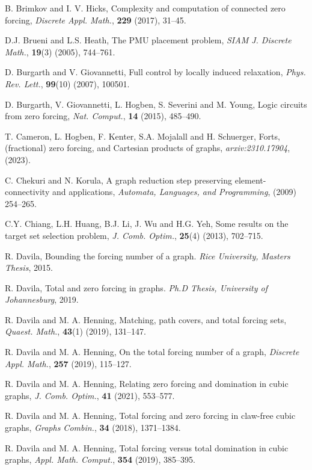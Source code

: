 \documentclass[11pt]{article}
\theoremstyle{definition}
\newcommand{\1}{\vspace{0.1cm}}
\newcommand{\2}{\vspace{0.2cm}}
\newcommand{\3}{\vspace{0.3cm}}
\begin{document}
\begin{thebibliography}{99}
 B. Brimkov and I. V. Hicks, Complexity and computation of connected zero forcing, \emph{Discrete Appl. Math.}, \textbf{229} (2017), 31--45.

D.J. Brueni and L.S. Heath,
The {PMU} placement problem, 
\emph{SIAM J. Discrete Math.}, \textbf{19}(3) (2005),
744--761.

D. Burgarth and V. Giovannetti,
Full control by locally induced relaxation,
\emph{Phys. Rev. Lett.}, \textbf{99}(10) (2007), 
100501.

D. Burgarth, V. Giovannetti,  L. Hogben, S. Severini and  M. Young,
Logic circuits from zero forcing,
\emph{Nat. Comput.}, \textbf{14} (2015), 485--490.

 T. Cameron, L. Hogben, F. Kenter, S.A. Mojalall and H. Schuerger, Forts, (fractional) zero forcing, and Cartesian products of graphs, \emph{arxiv:2310.17904}, (2023).

 C. Chekuri and N. Korula, A graph reduction step preserving element-connectivity and applications, \emph{Automata, Languages, and Programming}, (2009) 254--265. 

C.Y. Chiang, L.H. Huang, B.J. Li, J. Wu and H.G. Yeh,
Some results on the target set selection problem, 
\emph{J. Comb. Optim.}, \textbf{25}(4) (2013),
702--715.

 R. Davila, Bounding the forcing number of a graph. {\em Rice University, Masters Thesis}, 2015.

 R. Davila, Total and zero forcing in graphs. \emph{Ph.D Thesis, University of Johannesburg}, 2019.

 R. Davila and M. A. Henning, Matching, path covers, and total forcing sets, \emph{Quaest. Math.}, \textbf{43}(1) (2019), 131--147.

 R. Davila and M. A. Henning, On the total forcing number of a graph, \textit{Discrete Appl. Math.}, \textbf{257} (2019), 115--127.

 R. Davila and M. A. Henning, Relating zero forcing and domination in cubic graphs, \textit{J. Comb. Optim.}, \textbf{41} (2021), 553--577.

 R. Davila and M. A. Henning, Total forcing and zero forcing in claw-free cubic graphs, \textit{Graphs Combin.}, \textbf{34} (2018), 1371--1384.

 R. Davila and M. A. Henning, Total forcing versus total domination in cubic graphs, \textit{Appl. Math. Comput.}, \textbf{354} (2019), 385--395.


\end{thebibliography}
\end{document}
